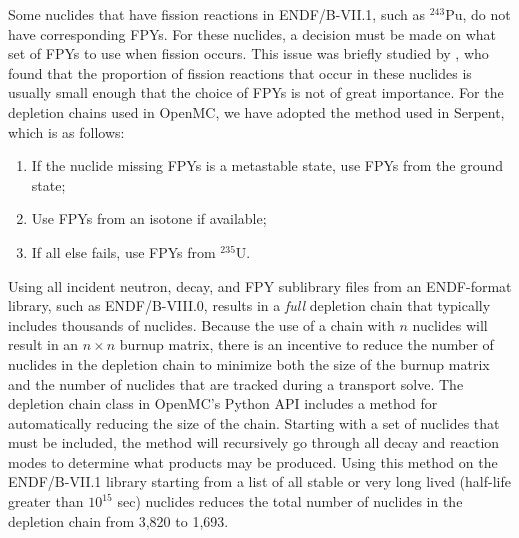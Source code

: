 \documentclass[3p,authoryear]{elsarticle}
\begin{document}
Some nuclides that have fission reactions in ENDF/B-VII.1, such as $^{243}$Pu,
do not have corresponding FPYs. For these nuclides, a decision must be made on
what set of FPYs to use when fission occurs. This issue was briefly studied by
\citet{fensin2015pne}, who found that the proportion of fission reactions that
occur in these nuclides is usually small enough that the choice of FPYs is not
of great importance. For the depletion chains used in OpenMC, we have adopted
the method used in Serpent, which is as follows:
\begin{enumerate}
  \item If the nuclide missing FPYs is a metastable state, use FPYs from the
  ground state;
  \item Use FPYs from an isotone if available;
  \item If all else fails, use FPYs from $^{235}$U.
\end{enumerate}

Using all incident neutron, decay, and FPY sublibrary files from an ENDF-format
library, such as ENDF/B-VIII.0, results in a \emph{full} depletion chain that
typically includes thousands of nuclides. Because the use of a chain with $n$
nuclides will result in an $n\times n$ burnup matrix, there is an incentive to
reduce the number of nuclides in the depletion chain to minimize both the size
of the burnup matrix and the number of nuclides that are tracked during a
transport solve. The depletion chain class in OpenMC's Python API includes a
method for automatically reducing the size of the chain. Starting with a set of
nuclides that must be included, the method will recursively go through all decay
and reaction modes to determine what products may be produced. Using this method
on the ENDF/B-VII.1 library starting from a list of all stable or very long
lived (half-life greater than $10^{15}$ sec) nuclides reduces the total number
of nuclides in the depletion chain from 3,820 to 1,693.
\end{document}
